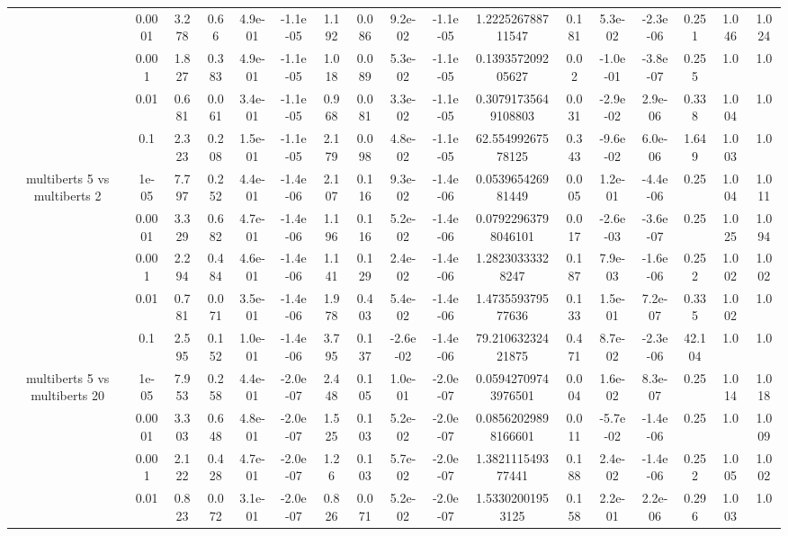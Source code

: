 \begin{tabular}{|c|c|c|c|c|c|c|c|c|c|c|c|c|c|c|c|c|}
 & 0.0001 & 3.278 & 0.66 & 4.9e-01 & -1.1e-05 & 1.192 & 0.086 & 9.2e-02 & -1.1e-05 & 1.222526788711547 & 0.181 & 5.3e-02 & -2.3e-06 & 0.251 & 1.046 & 1.024 \\
 & 0.001 & 1.827 & 0.383 & 4.9e-01 & -1.1e-05 & 1.018 & 0.089 & 5.3e-02 & -1.1e-05 & 0.139357209205627 & 0.02 & -1.0e-01 & -3.8e-07 & 0.255 & 1.0 & 1.0 \\
 & 0.01 & 0.681 & 0.061 & 3.4e-01 & -1.1e-05 & 0.968 & 0.081 & 3.3e-02 & -1.1e-05 & 0.30791735649108803 & 0.031 & -2.9e-02 & 2.9e-06 & 0.338 & 1.004 & 1.0 \\
 & 0.1 & 2.323 & 0.208 & 1.5e-01 & -1.1e-05 & 2.179 & 0.098 & 4.8e-02 & -1.1e-05 & 62.55499267578125 & 0.343 & -9.6e-02 & 6.0e-06 & 1.649 & 1.003 & 1.0 \\
\hline
\multirow{5}{*}{multiberts 5 vs multiberts 2} & 1e-05 & 7.797 & 0.252 & 4.4e-01 & -1.4e-06 & 2.107 & 0.116 & 9.3e-02 & -1.4e-06 & 0.053965426981449 & 0.005 & 1.2e-01 & -4.4e-06 & 0.25 & 1.004 & 1.011 \\
 & 0.0001 & 3.329 & 0.682 & 4.7e-01 & -1.4e-06 & 1.196 & 0.116 & 5.2e-02 & -1.4e-06 & 0.07922963798046101 & 0.017 & -2.6e-03 & -3.6e-07 & 0.25 & 1.025 & 1.094 \\
 & 0.001 & 2.294 & 0.484 & 4.6e-01 & -1.4e-06 & 1.141 & 0.129 & 2.4e-02 & -1.4e-06 & 1.28230333328247 & 0.187 & 7.9e-03 & -1.6e-06 & 0.252 & 1.002 & 1.002 \\
 & 0.01 & 0.781 & 0.071 & 3.5e-01 & -1.4e-06 & 1.978 & 0.403 & 5.4e-02 & -1.4e-06 & 1.473559379577636 & 0.133 & 1.5e-01 & 7.2e-07 & 0.335 & 1.002 & 1.0 \\
 & 0.1 & 2.595 & 0.152 & 1.0e-01 & -1.4e-06 & 3.795 & 0.137 & -2.6e-02 & -1.4e-06 & 79.21063232421875 & 0.471 & 8.7e-02 & -2.3e-06 & 42.104 & 1.0 & 1.0 \\
\hline
\multirow{5}{*}{multiberts 5 vs multiberts 20} & 1e-05 & 7.953 & 0.258 & 4.4e-01 & -2.0e-07 & 2.448 & 0.105 & 1.0e-01 & -2.0e-07 & 0.05942709743976501 & 0.004 & 1.6e-02 & 8.3e-07 & 0.25 & 1.014 & 1.018 \\
 & 0.0001 & 3.303 & 0.648 & 4.8e-01 & -2.0e-07 & 1.525 & 0.103 & 5.2e-02 & -2.0e-07 & 0.08562029898166601 & 0.011 & -5.7e-02 & -1.4e-06 & 0.25 & 1.0 & 1.009 \\
 & 0.001 & 2.122 & 0.428 & 4.7e-01 & -2.0e-07 & 1.26 & 0.103 & 5.7e-02 & -2.0e-07 & 1.382111549377441 & 0.188 & 2.4e-02 & -1.4e-06 & 0.252 & 1.005 & 1.002 \\
 & 0.01 & 0.823 & 0.072 & 3.1e-01 & -2.0e-07 & 0.826 & 0.071 & 5.2e-02 & -2.0e-07 & 1.53302001953125 & 0.158 & 2.2e-01 & 2.2e-06 & 0.296 & 1.003 & 1.0 \\

\end{tabular}
